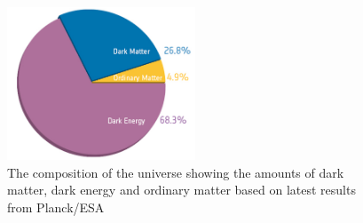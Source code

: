 \begin{figure}[hbtp]
   \centering
     \includegraphics[width=0.5\textwidth]{Chapters/02_Theory/Images/planck_cosmic_pie}\hfill
     \caption[The composition of the universe showing the amounts of dark matter, dark energy and ordinary
     matter.]{The composition of the universe showing the amounts of dark matter, dark energy and ordinary
     matter based on latest results from Planck/ESA~\cite{Ade:2013sjv}}
     \label{fig:universe_composition}
\end{figure}
